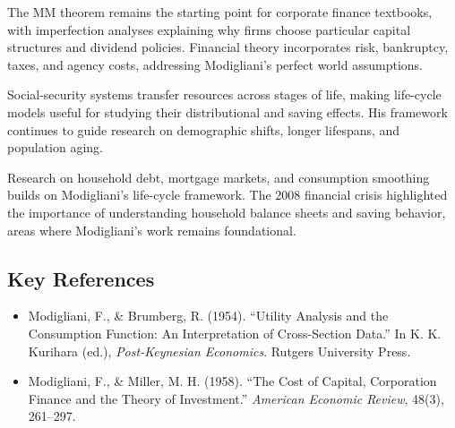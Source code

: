 The MM theorem remains the starting point for corporate finance textbooks,
with imperfection analyses explaining why firms choose particular capital
structures and dividend policies. Financial theory incorporates risk,
bankruptcy, taxes, and agency costs, addressing Modigliani's perfect world
assumptions.

Social-security systems transfer resources across stages of life, making
life-cycle models useful for studying their distributional and saving effects.
His framework continues to guide research on demographic shifts, longer
lifespans, and population aging.

Research on household debt, mortgage markets, and consumption smoothing
builds on Modigliani's life-cycle framework. The 2008 financial crisis
highlighted the importance of understanding household balance sheets and
saving behavior, areas where Modigliani's work remains foundational.

\subsection*{Key References}
\begin{itemize}
    \item Modigliani, F., \& Brumberg, R. (1954). ``Utility Analysis and the Consumption Function: An Interpretation of Cross-Section Data.'' In K. K. Kurihara (ed.), \textit{Post-Keynesian Economics}. Rutgers University Press.
    \item Modigliani, F., \& Miller, M. H. (1958). ``The Cost of Capital, Corporation Finance and the Theory of Investment.'' \textit{American Economic Review}, 48(3), 261--297.
\end{itemize}
